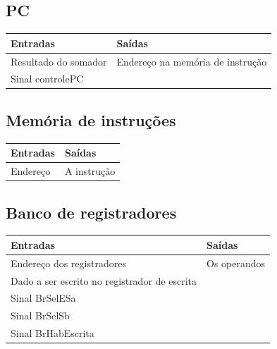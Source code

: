 \documentclass{article}
\begin{document}
 \subsection{PC}
 \FloatBarrier
    \begin{table}[H]
      \begin{center}
        \begin{tabular}[pos]{|m{7cm} | m{7cm}|} 
          \hline
          \cellcolor[gray]{0.9}\textbf{Entradas} & \cellcolor[gray]{0.9}\textbf{Saídas} \\ \hline
            Resultado do somador & Endereço na memória de instrução\\ \hline
            Sinal controlePC & \\ \hline
        \end{tabular}
      \end{center}
    \end{table}  
    
 \subsection{Memória de instruções}
  \FloatBarrier
    \begin{table}[H]
      \begin{center}
        \begin{tabular}[pos]{|m{7cm} | m{7cm}|} 
          \hline
          \cellcolor[gray]{0.9}\textbf{Entradas} & \cellcolor[gray]{0.9}\textbf{Saídas} \\ \hline
            Endereço & A instrução \\ \hline
        \end{tabular}
      \end{center}
    \end{table}  
    
 \subsection{Banco de registradores}
  \FloatBarrier
    \begin{table}[H]
      \begin{center}
        \begin{tabular}[pos]{|m{7cm} | m{7cm}|} 
          \hline
          \cellcolor[gray]{0.9}\textbf{Entradas} & \cellcolor[gray]{0.9}\textbf{Saídas} \\ \hline
            Endereço dos registradores & Os operandos\\ \hline
            Dado a ser escrito no registrador de escrita & \\ \hline
            Sinal BrSelESa & \\ \hline
            Sinal BrSelSb & \\ \hline
            Sinal BrHabEscrita & \\ \hline
        \end{tabular}
      \end{center}
    \end{table}  
    
\end{document}

